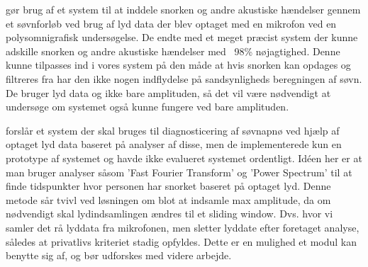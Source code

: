 \citet{Dafna2013} gør brug af et system til at inddele snorken og andre akustiske hændelser gennem et søvnforløb ved brug af lyd data der blev optaget med en mikrofon ved en polysomnigrafisk undersøgelse. 
De endte med et meget præcist system der kunne adskille snorken og andre akustiske hændelser med ~98\% nøjagtighed.
Denne kunne tilpasses ind i vores system på den måde at hvis snorken kan opdages og filtreres fra har den ikke nogen indflydelse på sandsynligheds beregningen af søvn. 
De bruger lyd data og ikke bare amplituden, så det vil være nødvendigt at undersøge om systemet også kunne fungere ved bare amplituden.

\citet{Calabrese20111101} forslår et system der skal bruges til diagnosticering af søvnapnø ved hjælp af optaget lyd data baseret på analyser af disse, men de implementerede kun en prototype af systemet og havde ikke evalueret systemet ordentligt. 
Idéen her er at man bruger analyser såsom 'Fast Fourier Transform' og 'Power Spectrum' til at finde tidspunkter hvor personen har snorket baseret på optaget lyd. 
Denne metode sår tvivl ved løsningen om blot at indsamle max amplitude, da om nødvendigt skal lydindsamlingen ændres til et sliding window.
Dvs. hvor vi samler det rå lyddata fra mikrofonen, men sletter lyddate efter foretaget analyse, således at privatlivs kriteriet stadig opfyldes.
Dette er en mulighed et modul kan benytte sig af, og bør udforskes med videre arbejde.
